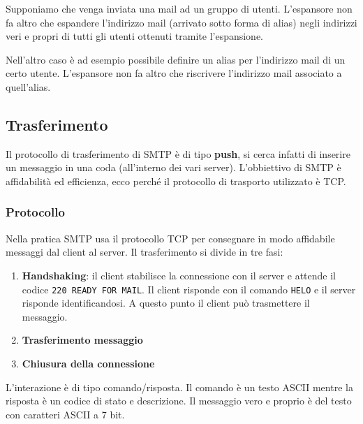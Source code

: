 Supponiamo che venga inviata una mail ad un gruppo di utenti. L'espansore non fa altro che
espandere l'indirizzo mail (arrivato sotto forma di alias) negli indirizzi veri e propri di tutti
gli utenti ottenuti tramite l'espansione.

Nell'altro caso è ad esempio possibile definire un alias per l'indirizzo mail di un certo utente.
L'espansore non fa altro che riscrivere l'indirizzo mail associato a quell'alias.

\subsection{Trasferimento}
Il protocollo di trasferimento di SMTP è di tipo \textbf{push}, si cerca infatti di inserire un 
messaggio in una coda (all'interno dei vari server). L'obbiettivo di SMTP è affidabilità ed
efficienza, ecco perché il protocollo di trasporto utilizzato è TCP.

\subsubsection{Protocollo}
Nella pratica SMTP usa il protocollo TCP per consegnare in modo affidabile messaggi dal client al
server. Il trasferimento si divide in tre fasi:
\begin{enumerate}
	\item \textbf{Handshaking}: il client stabilisce la connessione con il server e attende il
		codice \verb|220 READY FOR MAIL|. Il client risponde con il comando \verb|HELO| e il server
		risponde identificandosi. A questo punto il client può trasmettere il messaggio.
	\item \textbf{Trasferimento messaggio}
	\item \textbf{Chiusura della connessione}
\end{enumerate}
L'interazione è di tipo comando/risposta. Il comando è un testo ASCII mentre la risposta è un
codice di stato e descrizione. Il messaggio vero e proprio è del testo con caratteri ASCII a 7 bit.

